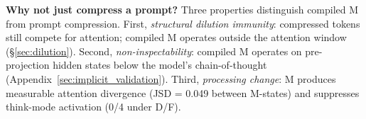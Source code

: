 \textbf{Why not just compress a prompt?} Three properties distinguish compiled M from prompt compression. First, \emph{structural dilution immunity}: compressed tokens still compete for attention; compiled M operates outside the attention window (\S\ref{sec:dilution}). Second, \emph{non-inspectability}: compiled M operates on pre-projection hidden states below the model's chain-of-thought (Appendix~\ref{sec:implicit_validation}). Third, \emph{processing change}: M produces measurable attention divergence (JSD = 0.049 between M-states) and suppresses think-mode activation (0/4 under D/F).

